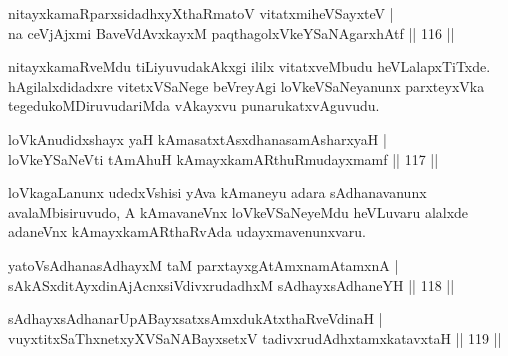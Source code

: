 \begin{shl}
\footnotemark[1]nitayxkamaRparxsidadhxyXthaRmatoV vitatxmiheVSayxteV |\\
na ceVjAjxmi BaveVdAvxkayxM paqthagolxVkeYSaNAgarxhAtf \hfill || 116 ||
\end{shl}

\begin{artha}
nitayxkamaRveMdu tiLiyuvudakAkxgi ililx vitatxveMbudu heVLalapxTiTxde. hAgilalxdidadxre vitetxVSaNege beVreyAgi loVkeVSaNeyanunx parxteyxVka tegedukoMDiruvudariMda vAkayxvu punarukatxvAguvudu.
\end{artha}

\begin{shl}
loVkAnudidxshayx yaH kAmasatxtAsxdhanasamAsharxyaH |\\
loVkeYSaNeVti tAmAhuH kAmayxkamARthuRmudayxmamf \hfill || 117 ||
\end{shl}

\begin{artha}%
loVkagaLanunx udedxVshisi yAva kAmaneyu adara sAdhanavanunx avalaMbisiruvudo, A kAmavaneVnx loVkeVSaNeyeMdu heVLuvaru alalxde adaneVnx kAmayxkamARthaRvAda udayxmavenunxvaru.
\end{artha}

\begin{shl}
yatoV\s sAdhanasAdhayxM taM parxtayxgAtAmxnamAtamxnA |\\
sAkASxditAyxdinA\s jAcnxsiVdivxrudadhxM sAdhayxsAdhaneYH \hfill || 118 ||
\end{shl}

\begin{shl}
sAdhayxsAdhanarUpABayxsatxsAmxdukAtxthaRveVdinaH |\\
vuyxtitxSaThxnetxyXVSaNABayxsetxV tadivxrudAdhxtamxkatavxtaH \hfill || 119 ||
\end{shl}


